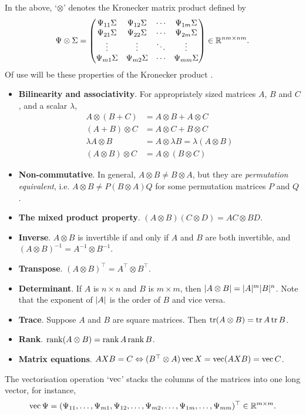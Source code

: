 In the above, `$\otimes$' denotes the Kronecker matrix product defined by
\[
  \Psi \otimes \Sigma = 
  \begin{pmatrix}
    \Psi_{11}\Sigma &\Psi_{12}\Sigma &\cdots &\Psi_{1m}\Sigma \\
    \Psi_{21}\Sigma &\Psi_{22}\Sigma &\cdots &\Psi_{2m}\Sigma \\    
    \vdots & \vdots &\ddots  &\vdots \\
    \Psi_{m1}\Sigma &\Psi_{m2}\Sigma &\cdots &\Psi_{mm}\Sigma \\
  \end{pmatrix} \in \mathbb{R}^{nm\times nm}.
\]
Of use will be these properties of the Kronecker product \citep{zhang2013kronecker}.
\begin{itemize}
  \item \textbf{Bilinearity and associativity}. For appropriately sized matrices $A$, $B$ and $C$, and a scalar $\lambda$,
  \begin{align*}
    A \otimes (B + C) &= A \otimes B + A \otimes C \\
    (A + B) \otimes C &= A \otimes C + B \otimes C \\
    \lambda A \otimes B &= A \otimes \lambda B = \lambda(A \otimes B) \\
    (A \otimes B) \otimes C &= A \otimes (B \otimes C)
  \end{align*}
  \item \textbf{Non-commutative}. In general, $A \otimes B \neq B \otimes A$, but they are \emph{permutation equivalent}, i.e. $A \otimes B \neq P(B \otimes A)Q$ for some permutation matrices $P$ and $Q$.
  \item \textbf{The mixed product property}. $(A \otimes B)(C \otimes D) = AC \otimes BD$.
  \item \textbf{Inverse}. $A \otimes B$ is invertible if and only if $A$ and $B$ are both invertible, and $(A \otimes B)^{-1} = A^{-1} \otimes B^{-1}$.
  \item \textbf{Transpose}. $(A \otimes B)^\top = A^\top \otimes B^\top$.
  \item \textbf{Determinant}. If $A$ is $n\times n$ and $B$ is $m \times m$, then $\lvert A \otimes B\rvert = \lvert A\rvert^m \lvert B\rvert^n$. Note that the exponent of $\lvert A\rvert$ is the order of $B$ and vice versa.
  \item \textbf{Trace}. Suppose $A$ and $B$ are square matrices. Then $\operatorname{tr} (A \otimes B) = \operatorname{tr} A \operatorname{tr} B$.
  \item \textbf{Rank}. $\operatorname{rank} (A \otimes B) = \operatorname{rank} A \operatorname{rank} B$.
  \item \textbf{Matrix equations}. $AXB = C \Leftrightarrow (B^\top \otimes A) \operatorname{vec} X = \operatorname{vec} (AXB) = \operatorname{vec} C$.
\end{itemize}
The vectorisation operation `$\operatorname{vec}$' stacks the columns of the matrices into one long vector, for instance,
\[
  \operatorname{vec} \Psi = (\Psi_{11},\dots,\Psi_{m1},\Psi_{12},\dots,\Psi_{m2},\dots,\Psi_{1m},\dots,\Psi_{mm})^\top \in \mathbb{R}^{m \times m}.
\]

